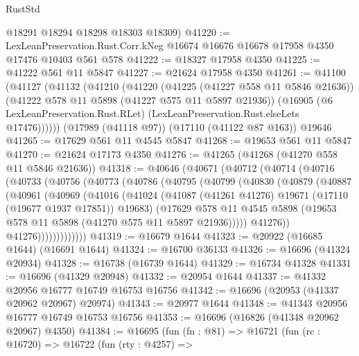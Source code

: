 \begin{lexlean}{RustStd}
\begin{coremodule}
      @18291
      @18294
      @18298
      @18303
      @18309)
@41220 := LexLeanPreservation.Rust.Corr.kNeg
    @16674
    @16676
    @16678
    @17958
    @4350
    @17476
    @10403
    @561
    @578
@41222 := @18327 @17958 @4350
@41225 := @41222 @561 @11 @5847
@41227 := @21624 @17958 @4350
@41261 := @41100
    (@41127
      (@41132
        (@41210
          (@41220
            (@41225 (@41227 @558 @11 @5846 @21636))
            (@41222 @578 @11 @5898 (@41227 @575 @11 @5897 @21936))
            (@16905
              (@6 LexLeanPreservation.Rust.RLet)
              (LexLeanPreservation.Rust.elseLets @17476))))))
    (@17989 (@41118 @97))
    (@17110 (@41122 @87 @163))
    @19646
@41265 := @17629 @561 @11 @4545 @5847
@41268 := @19653 @561 @11 @5847
@41270 := @21624 @17173 @4350
@41276 := @41265 (@41268 (@41270 @558 @11 @5846 @21636))
@41318 := @40646
    (@40671
      (@40712
        (@40714
          (@40716
            (@40733
              (@40756
                (@40773
                  (@40786
                    (@40795
                      (@40799
                        (@40830
                          (@40879
                            (@40887
                              (@40961
                                (@40969
                                  (@41016
                                    (@41024
                                      (@41087
                                        (@41261 @41276)
                                        @19671
                                        (@17110 (@19677 @1937 @17851))
                                        @19683)
                                      (@17629
                                        @578
                                        @11
                                        @4545
                                        @5898
                                        (@19653 @578 @11 @5898 (@41270 @575 @11 @5897 @21936)))))
                                  @41276))
                              @41276)))))))))))))
@41319 := @16679 @1644
@41323 := @20922 (@16685 @1644) (@16691 @1644)
@41324 := @16700 @36133
@41326 := @16696 (@41324 @20934)
@41328 := @16738 (@16739 @1644)
@41329 := @16734 @41328
@41331 := @16696 (@41329 @20948)
@41332 := @20954 @1644
@41337 := @41332 @20956 @16777 @16749 @16753 @16756
@41342 := @16696 (@20953 (@41337 @20962 @20967) @20974)
@41343 := @20977 @1644
@41348 := @41343 @20956 @16777 @16749 @16753 @16756
@41353 := @16696 (@16826 (@41348 @20962 @20967) @4350)
@41384 := @16695
    (fun (fn : @81) =>
    @16721
      (fun (rc : @16720) =>
      @16722
        (fun (rty : @4257) =>

\end{coremodule}
\end{lexlean}
